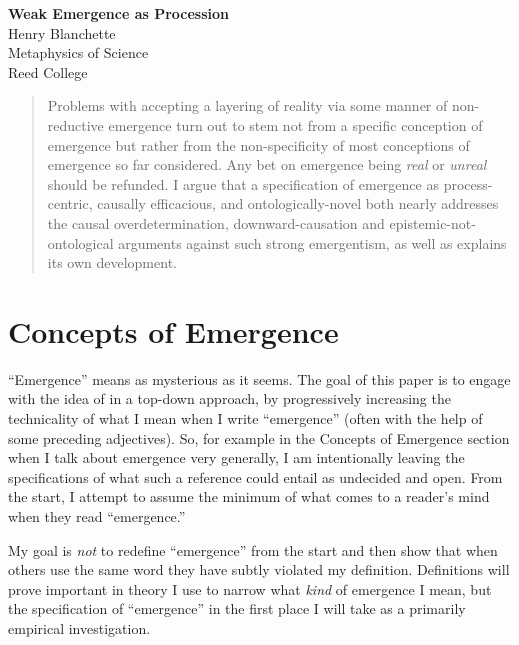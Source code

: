 \documentclass{article}
\newcommand{\ti}[1]{\textit{#1}}
\begin{document}

\begin{center}
	\huge{\bf Weak Emergence as Procession} %
    \\[0.75cm] 
	\large{Henry Blanchette} %
    \\[0.5cm]
	\large{Metaphysics of Science \\ Reed College} %
    \\[1.0cm]
\end{center}

\begin{abstract}
	Problems with accepting a layering of reality via some manner of non-reductive emergence turn out to stem not from a specific conception of emergence but rather from the non-specificity of most conceptions of emergence so far considered. Any bet on emergence being \ti{real} or \ti{unreal} should be refunded. I argue that a specification of emergence as process-centric, causally efficacious, and ontologically-novel both nearly addresses the causal overdetermination, downward-causation and epistemic-not-ontological arguments against such strong emergentism, as well as explains its own development.
\end{abstract}

\section{Concepts of Emergence}

``Emergence'' means as mysterious as it seems. The goal of this paper is to engage with the idea of in a top-down approach, by progressively increasing the technicality of what I mean when I write ``emergence'' (often with the help of some preceding adjectives). So, for example in the Concepts of Emergence section when I talk about emergence very generally, I am intentionally leaving the specifications of what such a reference could entail as undecided and open. From the start, I attempt to assume the minimum of what comes to a reader's mind when they read ``emergence.''

My goal is \ti{not} to redefine ``emergence'' from the start and then show that when others use the same word they have subtly violated my definition. Definitions will prove important in theory I use to narrow what \ti{kind} of emergence I mean, but the specification of ``emergence'' in the first place I will take as a primarily empirical investigation.
\end{document}
